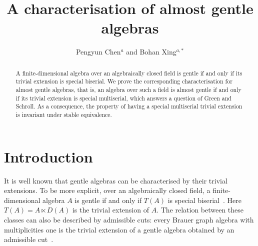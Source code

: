 \documentclass[11pt]{article}
\title{A characterisation of almost gentle algebras}
\author{Pengyun Chen$^{a}$ and Bohan Xing$^{a,*}$}
\date{}
\theoremstyle{definition}
\begin{document}
	\maketitle

	\begingroup
		\renewcommand{\thefootnote}{}
		\makeatletter
		\renewcommand{\@makefntext}[1]{%
			\setlength{\parindent}{2em}%
			\noindent\hspace*{\parindent}#1}
		\makeatother
		\begin{NoHyper}
		\end{NoHyper}
	\endgroup

	\begin{abstract}
		A finite-dimensional algebra over an algebraically closed field is gentle if and only if its trivial extension is special biserial.
		We prove the corresponding characterisation for almost gentle algebras, that is, an algebra over such a field is almost gentle if and only if its trivial extension is special multiserial, which answers a question of Green and Schroll.
		As a consequence, the property of having a special multiserial trivial extension is invariant under stable equivalence.
	\end{abstract}

\section{Introduction}
\label{sec:introduction}

	It is well known that gentle algebras can be characterised by their trivial extensions.
	To be more explicit, over an algebraically closed field, a finite-dimensional algebra $A$ is gentle if and only if $T(A)$ is special biserial~\cite{PogorzalySkowronskiBiserial}.
	Here $T(A)=A\ltimes D(A)$ is the trivial extension of $A$.
	The relation between these classes can also be described by admissible cuts: every Brauer graph algebra with multiplicities one is the trivial extension of a gentle algebra obtained by an admissible cut~\cite{SchrollTrivial}.
\end{document}
